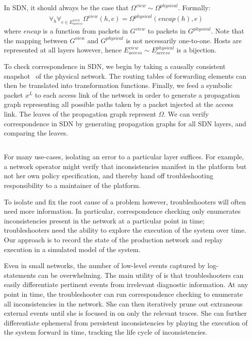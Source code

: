 In SDN, it should always be the case that 
$\Omega^{view} \sim \Omega^{physical}$. 
Formally:
\begin{align*}
\forall_{h} \forall_{e \in E_{access}^{view}} \Omega^{view}(h,e) =
\Omega^{physical}(encap(h),e) 
\end{align*}
where $encap$ is a function from packets in $G^{view}$ to packets in
$G^{physical}$. Note that the mapping between $G^{view}$ and $G^{physical}$ is not
necessarily one-to-one. Hosts are represented at all layers however, hence
$E_{access}^{view} \sim E_{access}^{physical}$ is a bijection.

To check correspondence in SDN, we begin by taking a causally consistent
snapshot~\cite{Chandy:1985:DSD:214451.214456} of the physical network. The routing
tables of forwarding elements can then be translated into transformation functions.
Finally, we feed a symbolic packet $x^L$ to each access link of the network in
order to generate
a propagation graph representing all possible paths taken by a packet injected
at the access link. The leaves of the propagation graph represent $\Omega$. We
can verify correspondence in SDN by generating propagation graphs for all SDN layers,
and comparing the leaves.

\subsection{\SIMULATOR}

For many use-cases, isolating an error to a particular layer suffices.
For example, a network operator might verify that inconsistencies manifest in
the platform but not her own policy specification, and thereby hand off
troubleshooting responsibility to a maintainer of the platform. 

To isolate and fix the root cause of a problem however, troubleshooters will often
need more information. In particular, correspondence checking only enumerates
inconsistencies present in the network at a particular point in time;
troubleshooters need the ability to explore the execution of the system over
time. Our approach is to record the state of the production network and replay 
execution in a simulated model of the system.

Even in small networks,
the number of low-level events captured by
log-statements can be overwhelming. The main utility of \simulator is that
troubleshooters can easily differentiate pertinent events from
irrelevant diagnostic information. At any point in time, the troubleshooter
can run correspondence checking to enumerate all inconsistencies in the
network. She can then iteratively prune out extraneous external events until
she is focused in on only the relevant traces. She can further differentiate
ephemeral from persistent inconsistencies by playing the execution of the
system forward in time, tracking the life cycle of inconsistencies.

